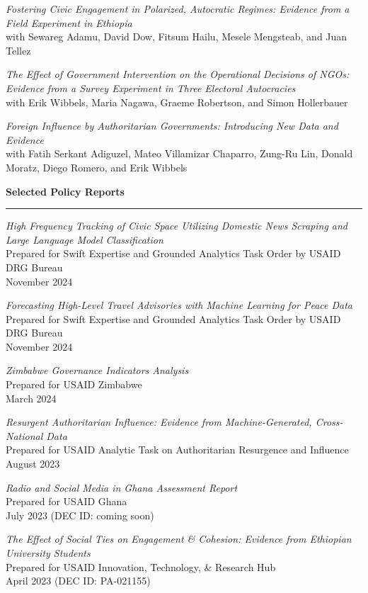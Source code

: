 \documentclass[11pt]{article}
\begin{document}
{\sl Fostering Civic Engagement in Polarized, Autocratic Regimes: Evidence from a Field Experiment in Ethiopia}\\
with Sewareg Adamu, David Dow, Fitsum Hailu, Mesele Mengsteab, and Juan Tellez

{\sl The Effect of Government Intervention on the Operational Decisions of NGOs: Evidence from a Survey Experiment in Three Electoral Autocracies}\\
with Erik Wibbels, Maria Nagawa, Graeme Robertson, and Simon Hollerbauer

{\sl Foreign Influence by Authoritarian Governments: Introducing New Data and Evidence}\\
with Fatih Serkant Adiguzel, Mateo Villamizar Chaparro, Zung-Ru Lin, Donald Moratz, Diego Romero, and Erik Wibbels

\textbf{\large Selected Policy Reports}\\
\rule[3mm]{\textwidth}{.2pt}


{\sl High Frequency Tracking of Civic Space Utilizing Domestic News Scraping and Large Language Model Classification}\\
Prepared for Swift Expertise and Grounded Analytics Task Order by USAID DRG Bureau\\
November 2024

{\sl Forecasting High-Level Travel Advisories with Machine Learning for Peace Data}\\
Prepared for Swift Expertise and Grounded Analytics Task Order by USAID DRG Bureau\\
November 2024

{\sl Zimbabwe Governance Indicators Analysis}\\
Prepared for USAID Zimbabwe\\
March 2024

{\sl Resurgent Authoritarian Influence: Evidence from Machine-Generated, Cross-National Data}\\
Prepared for USAID Analytic Task on Authoritarian Resurgence and Influence\\
August 2023

{\sl Radio and Social Media in Ghana Assessment Report}\\
Prepared for USAID Ghana\\
July 2023 (DEC ID: coming soon)

{\sl The Effect of Social Ties on Engagement \& Cohesion: Evidence from Ethiopian University Students}\\
Prepared for USAID Innovation, Technology, \& Research Hub\\
April 2023 (DEC ID: PA-021155)
\end{document}
